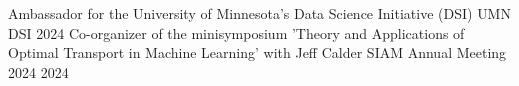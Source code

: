 

\begin{cvservices}
    \cvservice
        {Ambassador for the University of Minnesota's Data Science Initiative (DSI)} %
        {UMN DSI}
        {2024} %
    \cvservice
        {Co-organizer of the minisymposium 'Theory and Applications of Optimal Transport in Machine Learning' with Jeff Calder} %
        {SIAM Annual Meeting 2024}
        {2024} %
    \end{cvservices}
    

